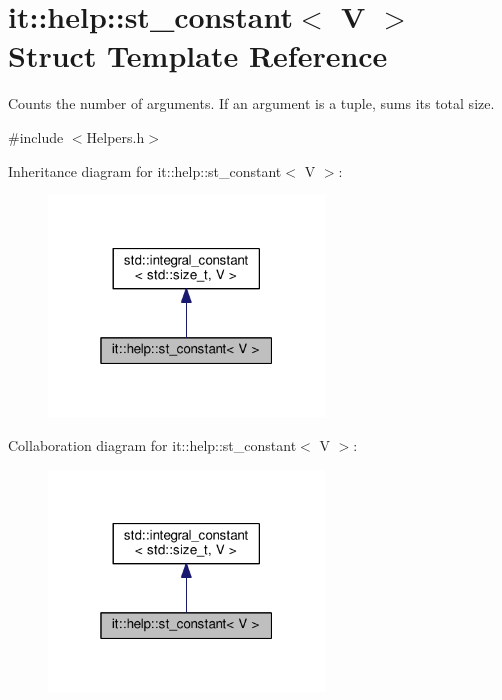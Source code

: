 \hypertarget{structit_1_1help_1_1st__constant}{}\section{it\+:\+:help\+:\+:st\+\_\+constant$<$ V $>$ Struct Template Reference}
\label{structit_1_1help_1_1st__constant}


Counts the number of arguments. If an argument is a tuple, sums its total size.  




{\ttfamily \#include $<$Helpers.\+h$>$}



Inheritance diagram for it\+:\+:help\+:\+:st\+\_\+constant$<$ V $>$\+:\nopagebreak
\begin{figure}[H]
\begin{center}
\leavevmode
\includegraphics[width=208pt]{structit_1_1help_1_1st__constant__inherit__graph}
\end{center}
\end{figure}


Collaboration diagram for it\+:\+:help\+:\+:st\+\_\+constant$<$ V $>$\+:\nopagebreak
\begin{figure}[H]
\begin{center}
\leavevmode
\includegraphics[width=208pt]{structit_1_1help_1_1st__constant__coll__graph}
\end{center}
\end{figure}


